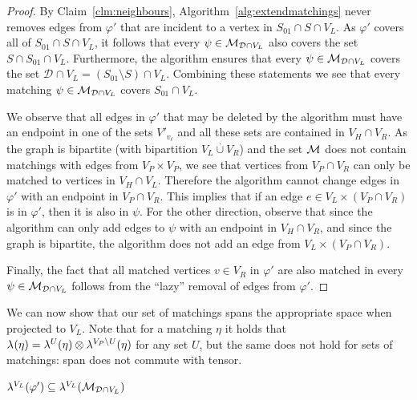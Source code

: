 \documentclass{theoretics}
\newcommand{\disjointunion}{\overset{.}{\cup}}
\newcommand{\V}[1][]{V_{#1}}
\newcommand{\Vl}{\V[L]}
\newcommand{\Vr}{\V[R]}
\newcommand{\Vp}{\V[P]}
\newcommand{\Vh}{\V[H]}
\newcommand{\linmap}[1][]{\ensuremath \lambda_{{#1}}}
\newcommand{\linmapof}[2][]{\linmap[#1](#2)}
\newcommand{\linmapl}[2][]{\ensuremath \lambda^{{#2}}_{{#1}}}
\newcommand{\linmaplof}[3][]{\linmapl[#1]{#2}(#3)}
\newcommand{\diffclosure}[1][]{D_{{#1}}}
\renewcommand{\diffclosure}[1][]{\mathcal{D}_{{#1}}}
\newcommand{\matchb}{\varphi'}
\newcommand{\matchc}{\psi}
\newcommand{\matche}{\eta}
\newcommand{\matchings}[1][]{\ensuremath \mathcal{M}_{{#1}}}
\newcommand{\tensor}{\ensuremath \otimes}
\numberwithin{equation}{section}
\begin{document}
\begin{proof}
  By Claim~\ref{clm:neighbours}, 
  Algorithm~\ref{alg:extendmatchings} never removes edges from $\matchb$
  that are incident to
  a vertex in $S_{01} \cap S \cap \Vl$. As 
  $\matchb$ covers all of $S_{01} \cap S \cap \Vl$,
  it follows that every
  $\matchc \in \matchings[\diffclosure \cap \Vl]$ also covers the set
  $S \cap S_{01} \cap \Vl$. 
  Furthermore, the algorithm ensures that every 
  $\matchc \in \matchings[\diffclosure \cap \Vl]$
  covers the set $\diffclosure \cap \Vl = (S_{01} \setminus S) \cap
  \Vl$.
  Combining these statements we see that every matching
  $\matchc \in \matchings[\diffclosure \cap \Vl]$ covers
  $S_{01} \cap \Vl$.
  
  We observe that all edges in $\matchb$ that
  may be deleted by the algorithm must have an endpoint in one of the
  sets $V'_{v_\ell}$ and all these sets are contained in
  $\Vh \cap \Vr$. As the graph is bipartite (with bipartition
  $\Vl \disjointunion \Vr$) and the set $\matchings$ does not contain
  matchings with edges from $\Vp \times \Vp$, we see that vertices from
  $\Vp \cap \Vr$ can only be matched to vertices in
  $\Vh \cap\Vl$.
  Therefore the algorithm cannot change edges in $\matchb$ with
  an endpoint in $\Vp \cap \Vr$.
  This implies that if an edge $e \in \Vl \times (\Vp \cap \Vr)$ is in $\matchb$, then it is also in $\matchc$.
  For the other direction, observe that since the algorithm can only add
  edges to $\matchc$ with an endpoint in $\Vh \cap \Vr$, and since the graph
is bipartite, the algorithm does not add an edge from $ \Vl \times (\Vp \cap \Vr)$.

  Finally, the fact that all matched vertices $v \in \Vr$ in $\matchb$ are also matched
  in every $\matchc \in \matchings[\diffclosure \cap \Vl]$ 
  follows from the ``lazy'' removal of edges from $\matchb$.
\end{proof}

We can now show that our set of matchings spans the appropriate space
when projected to $\Vl$.
Note that for a matching $\matche$ it holds that
$\linmapof{\matche} = \linmaplof{U}{\matche} \tensor \linmaplof{\Vp
  \setminus U}{\matche}$ for any set  $U$, but the same does not hold
for sets of matchings: span does not commute with tensor.

\begin{claim}\label{clm:span_matchings}
  $
    \linmaplof{\Vl}{\matchb}
    \subseteq
    \linmaplof{\Vl}{\matchings[\diffclosure \cap \Vl]}
  $
\end{claim}
\end{document}
